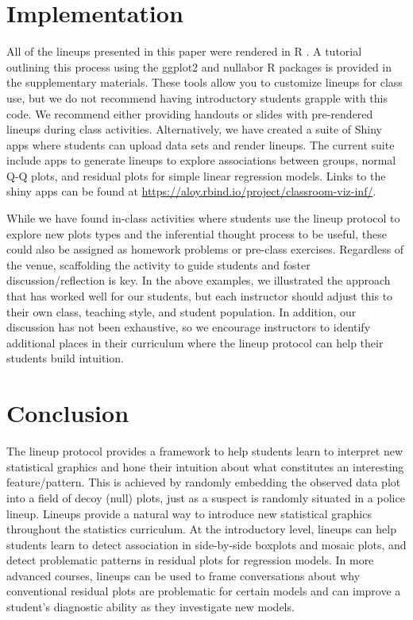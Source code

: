 \documentclass[12pt]{article}
\begin{document}
\hypertarget{implementation}{%
\section{Implementation}\label{implementation}}

\label{sec:implement}

All of the lineups presented in this paper were rendered in R \citep{r}.
A tutorial outlining this process using the ggplot2 \citep{ggplot2} and
nullabor \citep{nullabor} R packages is provided in the supplementary
materials. These tools allow you to customize lineups for class use, but
we do not recommend having introductory students grapple with this code.
We recommend either providing handouts or slides with pre-rendered
lineups during class activities. Alternatively, we have created a suite
of Shiny apps \citep{shiny} where students can upload data sets and
render lineups. The current suite include apps to generate lineups to
explore associations between groups, normal Q-Q plots, and residual
plots for simple linear regression models. Links to the shiny apps can
be found at \url{https://aloy.rbind.io/project/classroom-viz-inf/}.

While we have found in-class activities where students use the lineup
protocol to explore new plots types and the inferential thought process
to be useful, these could also be assigned as homework problems or
pre-class exercises. Regardless of the venue, scaffolding the activity
to guide students and foster discussion/reflection is key. In the above
examples, we illustrated the approach that has worked well for our
students, but each instructor should adjust this to their own class,
teaching style, and student population. In addition, our discussion has
not been exhaustive, so we encourage instructors to identify additional
places in their curriculum where the lineup protocol can help their
students build intuition.

\hypertarget{conclusion}{%
\section{Conclusion}\label{conclusion}}

\label{sec:conclusion}

The lineup protocol provides a framework to help students learn to
interpret new statistical graphics and hone their intuition about what
constitutes an interesting feature/pattern. This is achieved by randomly
embedding the observed data plot into a field of decoy (null) plots,
just as a suspect is randomly situated in a police lineup. Lineups
provide a natural way to introduce new statistical graphics throughout
the statistics curriculum. At the introductory level, lineups can help
students learn to detect association in side-by-side boxplots and mosaic
plots, and detect problematic patterns in residual plots for regression
models. In more advanced courses, lineups can be used to frame
conversations about why conventional residual plots are problematic for
certain models and can improve a student's diagnostic ability as they
investigate new models.
\end{document}

